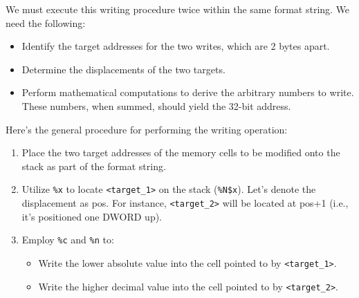 We must execute this writing procedure twice within the same format string.
We need the following: 
\begin{itemize}
    \item Identify the target addresses for the two writes, which are 2 bytes apart.
    \item Determine the displacements of the two targets.
    \item Perform mathematical computations to derive the arbitrary numbers to write. 
        These numbers, when summed, should yield the 32-bit address.
\end{itemize}
Here's the general procedure for performing the writing operation:
\begin{enumerate}
    \item Place the two target addresses of the memory cells to be modified onto the stack as part of the format string.
    \item  Utilize \texttt{\%x} to locate \texttt{<target\_1>} on the stack (\texttt{\%N\$x}). 
        Let's denote the displacement as pos. 
        For instance, \texttt{<target\_2>} will be located at pos+1 (i.e., it's positioned one DWORD up).
    \item Employ \texttt{\%c} and \texttt{\%n} to:
        \begin{itemize}
            \item Write the lower absolute value into the cell pointed to by \texttt{<target\_1>}.
            \item Write the higher decimal value into the cell pointed to by \texttt{<target\_2>}.
        \end{itemize}
\end{enumerate}

